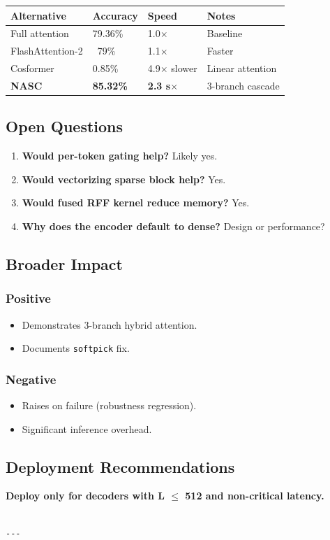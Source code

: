 \begin{table}[H]
\centering
\small
\begin{tabular}{llll}
\toprule
\textbf{Alternative} & \textbf{Accuracy} & \textbf{Speed} & \textbf{Notes} \\
\midrule
Full attention & 79.36\% & 1.0$\times$ & Baseline \\
FlashAttention-2 & ~79\% & 1.1$\times$ & Faster \\
Cosformer & 0.85\% & 4.9$\times$ slower & Linear attention \\
\textbf{NASC} & \textbf{85.32\%} & \textbf{2.3 s$\times$} & 3-branch cascade \\
\bottomrule
\end{tabular}
\end{table}

\subsection{Open Questions}

\begin{enumerate}
\item \textbf{Would per-token gating help?} Likely yes.
\item \textbf{Would vectorizing sparse block help?} Yes.
\item \textbf{Would fused RFF kernel reduce memory?} Yes.
\item \textbf{Why does the encoder default to dense?} Design or performance?

\end{enumerate}
\subsection{Broader Impact}

\subsubsection{Positive}

\begin{itemize}
\item Demonstrates 3-branch hybrid attention.
\item Documents \texttt{softpick} fix.

\end{itemize}
\subsubsection{Negative}

\begin{itemize}
\item Raises on failure (robustness regression).
\item Significant inference overhead.

\end{itemize}
\subsection{Deployment Recommendations}

\textbf{Deploy only for decoders with L $\le$ 512 and non-critical latency.}
\begin{lstlisting}

---
\end{lstlisting}